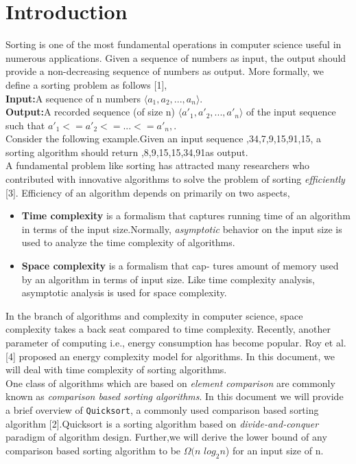 \documentclass[a4paper,10pt,twocolumn]{article}
\begin{document}
\section{Introduction}
Sorting is one of the most fundamental operations in computer science useful in numerous applications. Given a sequence of numbers as input, the output should provide a non-decreasing sequence of numbers as output. More formally, we define a sorting problem as follows [1],\\
\textbf{Input:}A sequence of n numbers $\big \langle a_1,a_2,...,a_n \big \rangle$.\\
\textbf{Output:}A recorded sequence (of size n) $\big \langle a'_1,a'_2,...,a'_n \big \rangle$ of the input sequence such that $a'_1<=a'_2<=...<=a'_n,$.\\
Consider the following example.Given an input sequence \big {},34,7,9,15,91,15\big \rangle, a sorting algorithm should return \big {},8,9,15,15,34,91\big \rangle as output.\\
\indent A fundamental problem like sorting has attracted
many researchers who contributed with innovative
algorithms to solve the problem of sorting \textit{efficiently} [3]. Efficiency of an algorithm depends on
primarily on two aspects,
\begin{itemize}
  \item \textbf{Time complexity} is a formalism that captures running time of an algorithm in terms of the input size.Normally, \textit{asymptotic} behavior on the input size is used to analyze the time complexity of algorithms.
  \item \textbf{Space complexity} is a formalism that cap-
tures amount of memory used by an algorithm
in terms of input size. Like time complexity
analysis, asymptotic analysis is used for space
complexity.
\end{itemize}
In the branch of algorithms and complexity in computer science, space complexity takes a back seat
compared to time complexity. Recently, another
parameter of computing i.e., energy consumption
has become popular. Roy et al. [4] proposed an energy complexity model for algorithms. In this document, we will deal with time complexity of sorting
algorithms.\\
\indent One class of algorithms which are based on \textit{element comparison} are commonly known as \textit{comparison based sorting algorithms}. In this document we will provide a brief overview of \texttt{Quicksort}, a commonly
used comparison based sorting algorithm [2].Quicksort
is a sorting algorithm based on \textit{divide-and-conquer}
paradigm of algorithm design. Further,we will derive the lower bound of any comparison based sorting algorithm to be $\Omega(n$ $log_2 n$) for an input size of n.
\end{document}
